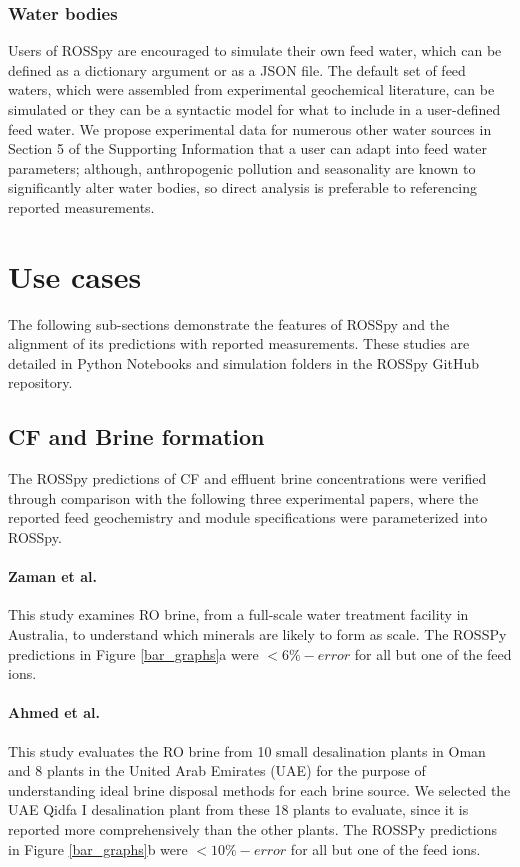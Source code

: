 \subsubsection{Water bodies}
Users of ROSSpy are encouraged to simulate their own feed water, which can be defined as a dictionary argument or as a JSON file. The default set of feed waters, which were assembled from experimental geochemical literature, can be simulated or they can be a syntactic model for what to include in a user-defined feed water. We propose experimental data for numerous other water sources in Section 5 of the Supporting Information that a user can adapt into feed water parameters; although, anthropogenic pollution \cite{Chen2008SourcesSea} and seasonality \cite{Sarthou2001SeasonalSea} are known to significantly alter water bodies, so direct analysis is preferable to referencing reported measurements. 

\section{Use cases}
The following sub-sections demonstrate the features of ROSSpy and the alignment of its predictions with reported measurements. These studies are detailed in Python Notebooks and simulation folders in the ROSSpy GitHub repository.

\subsection{CF and Brine formation}
The ROSSpy predictions of CF and effluent brine concentrations were verified through comparison with the following three experimental papers, where the reported feed geochemistry and module specifications were parameterized into ROSSpy. 

\paragraph{Zaman et al.\cite{Zaman2015DownstreamCompounds}}
This study  examines RO brine, from a full-scale water treatment facility in Australia, to understand which minerals are likely to form as scale. The ROSSPy predictions in Figure \ref{bar_graphs}a were $<6\%-error$ for all but one of the feed ions.

\paragraph{Ahmed et al.\cite{Ahmed2001BrineEmirates}}
This study  evaluates the RO brine from 10 small desalination plants in Oman and 8 plants in the United Arab Emirates (UAE) for the purpose of understanding ideal brine disposal methods for each brine source. We selected the UAE Qidfa I desalination plant from these 18 plants to evaluate, since it is reported more comprehensively than the other plants. The ROSSPy predictions in Figure \ref{bar_graphs}b were $<10\%-error$ for all but one of the feed ions.

